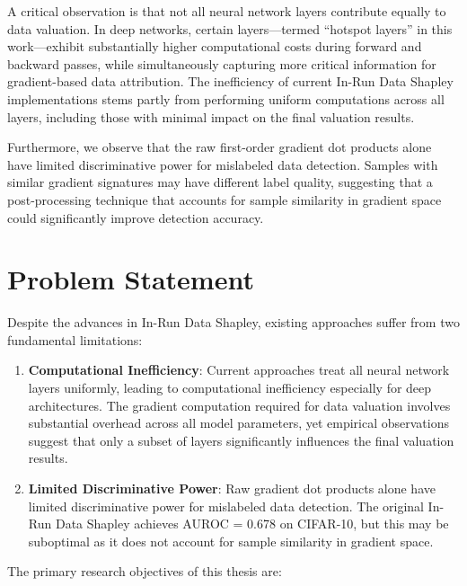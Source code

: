 \documentclass[12pt,a4paper]{report}
\begin{document}
A critical observation is that not all neural network layers contribute equally to data valuation. In deep networks, certain layers---termed ``hotspot layers'' in this work---exhibit substantially higher computational costs during forward and backward passes, while simultaneously capturing more critical information for gradient-based data attribution. The inefficiency of current In-Run Data Shapley implementations stems partly from performing uniform computations across all layers, including those with minimal impact on the final valuation results.

Furthermore, we observe that the raw first-order gradient dot products alone have limited discriminative power for mislabeled data detection. Samples with similar gradient signatures may have different label quality, suggesting that a post-processing technique that accounts for sample similarity in gradient space could significantly improve detection accuracy.

\section{Problem Statement}
\label{sec:problem}

Despite the advances in In-Run Data Shapley, existing approaches suffer from two fundamental limitations:

\begin{enumerate}
    \item \textbf{Computational Inefficiency}: Current approaches treat all neural network layers uniformly, leading to computational inefficiency especially for deep architectures. The gradient computation required for data valuation involves substantial overhead across all model parameters, yet empirical observations suggest that only a subset of layers significantly influences the final valuation results.
    
    \item \textbf{Limited Discriminative Power}: Raw gradient dot products alone have limited discriminative power for mislabeled data detection. The original In-Run Data Shapley achieves AUROC = 0.678 on CIFAR-10, but this may be suboptimal as it does not account for sample similarity in gradient space.
\end{enumerate}

\bigskip
\noindent The primary research objectives of this thesis are:
\end{document}
